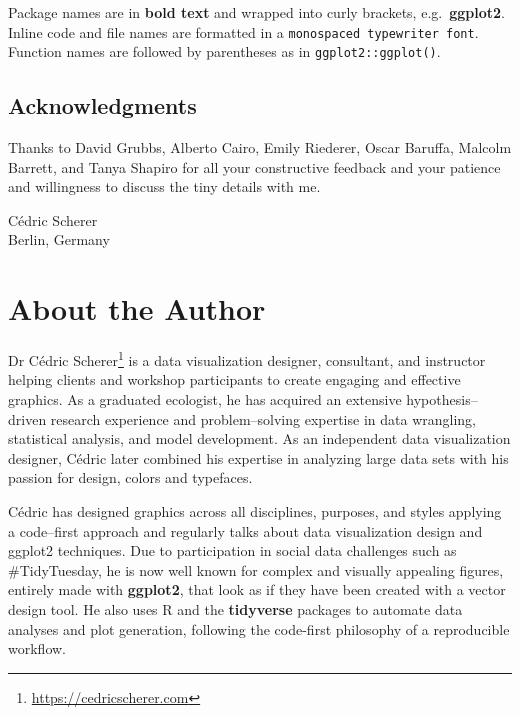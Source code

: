 \documentclass[
]{krantz}
\renewcommand{\href}[2]{#2\footnote{\url{#1}}}
\begin{document}
Package names are in \textbf{bold text} and wrapped into curly brackets, e.g.~\textbf{ggplot2}. Inline code and file names are formatted in a \texttt{monospaced\ typewriter\ font}. Function names are followed by parentheses as in \texttt{ggplot2::ggplot()}.

\hypertarget{acknowledgments}{%
\section*{Acknowledgments}\label{acknowledgments}}


Thanks to David Grubbs, Alberto Cairo, Emily Riederer, Oscar Baruffa, Malcolm Barrett, and Tanya Shapiro for all your constructive feedback and your patience and willingness to discuss the tiny details with me.

\begin{flushright}
Cédric Scherer\\
Berlin, Germany
\end{flushright}

\hypertarget{about-the-author}{%
\chapter*{About the Author}\label{about-the-author}}


\href{https://cedricscherer.com}{Dr Cédric Scherer} is a data visualization designer, consultant, and instructor helping clients and workshop participants to create engaging and effective graphics. As a graduated ecologist, he has acquired an extensive hypothesis--driven research experience and problem--solving expertise in data wrangling, statistical analysis, and model development. As an independent data visualization designer, Cédric later combined his expertise in analyzing large data sets with his passion for design, colors and typefaces.

Cédric has designed graphics across all disciplines, purposes, and styles applying a code--first approach and regularly talks about data visualization design and ggplot2 techniques. Due to participation in social data challenges such as \#TidyTuesday, he is now well known for complex and visually appealing figures, entirely made with \textbf{ggplot2}, that look as if they have been created with a vector design tool. He also uses R and the \textbf{tidyverse} packages to automate data analyses and plot generation, following the code-first philosophy of a reproducible workflow.

\mainmatter
\end{document}
